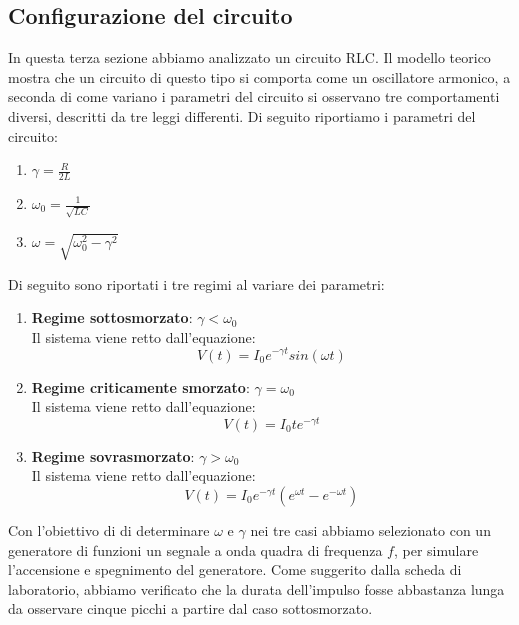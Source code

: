 \documentclass[letterpaper,12pt]{article}
\begin{document}
\subsection{Configurazione del circuito}
In questa terza sezione abbiamo analizzato un circuito RLC. Il modello teorico mostra che un circuito di questo tipo si comporta come un oscillatore armonico, a seconda di come variano i parametri del circuito si osservano tre comportamenti diversi, descritti da tre leggi differenti. Di seguito riportiamo i parametri del circuito:
\begin{enumerate}
	\item $\gamma = \frac{R}{2L}$
	\item $\omega_0 = \frac{1}{\sqrt{LC}}$
	\item $\omega = \sqrt{\omega_0^2 - \gamma^2}$
\end{enumerate}
Di seguito sono riportati i tre regimi al variare dei parametri:
\begin{enumerate}
	\item \textbf{Regime sottosmorzato}: $\gamma < \omega_0$\\
	      Il sistema viene retto dall'equazione:
	      \begin{equation}
		      \label{eq: Modello sottosmorzato}
		      V(t) = I_0e^{-\gamma t} sin(\omega t)
	      \end{equation}

	\item \textbf{Regime criticamente smorzato}: $\gamma = \omega_0$\\
	      Il sistema viene retto dall'equazione:
	      \begin{equation}
              \label{eq: Modello criticamente smorzato}
		      V(t) = I_0 t e^{-\gamma t}
	      \end{equation}

	\item \textbf{Regime sovrasmorzato}: $\gamma > \omega_0$\\
	      Il sistema viene retto dall'equazione:
	      \begin{equation}
              \label{eq: Modello sovrasmorzato}
		      V(t) = I_0 e^{-\gamma t} (e^{\omega t} - e^{-\omega t})
	      \end{equation}
\end{enumerate}
Con l'obiettivo di di determinare $\omega$ e $\gamma$ nei tre casi abbiamo selezionato con un generatore di funzioni un segnale a onda quadra di frequenza $f$, per simulare l'accensione e spegnimento del generatore. Come suggerito dalla scheda di laboratorio, abbiamo verificato che la durata dell'impulso fosse abbastanza lunga da osservare cinque picchi a partire dal caso sottosmorzato.
\end{document}

